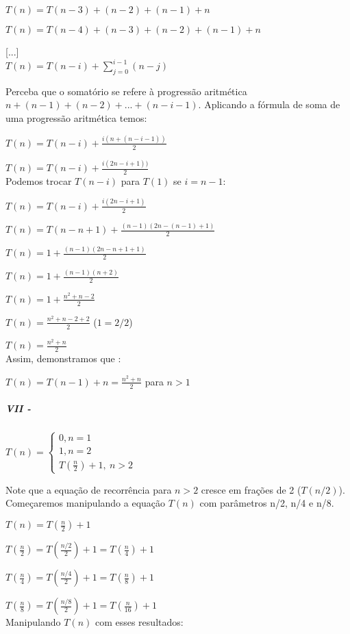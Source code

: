\documentclass[a4paper, twocolumn]{article}
\theoremstyle{definition}
\begin{document}
$T(n) =  T(n-3) + (n-2) + (n-1) + n$

$T(n) =  T(n-4) + (n-3) + (n-2) + (n-1) + n$

[...] \\

$T(n) =  T(n-i) + \sum_{j=0}^{i-1} (n-j)$

Perceba que o somatório se refere à progressão aritmética $n + (n-1) + (n-2) + ... + (n-i-1)$. Aplicando a fórmula de soma de uma progressão aritmética temos:

$T(n) = T(n-i) + \frac{i(n + (n-i-1))}{2}$

$T(n) = T(n-i) + \frac{i(2n-i+1))}{2}$ \\

Podemos trocar $T(n-i)$ para $T(1)$ se $i=n-1$:

$T(n) = T(n-i) + \frac{i(2n-i+1)}{2}$

$T(n) =  T(n-n+1) + \frac{(n-1)(2n-(n-1)+1)}{2}$

$T(n) =  1 + \frac{(n-1)(2n-n+1+1)}{2}$

$T(n) =  1 + \frac{(n-1)(n+2)}{2}$

$T(n) =  1 + \frac{n^2 + n -2}{2}$

$T(n) =  \frac{n^2 + n -2 + 2}{2}$ ($1=2/2$)

$T(n) =  \frac{n^2 + n}{2}$ \\

Assim, demonstramos que :

$T(n) = T(n-1) + n = \frac{n^2 + n}{2}$ para $n > 1$


\subparagraph{VII - } {$T(n) = \begin{cases} 
		0, n  = 1\\
		1, n  = 2\\
		T(\frac{n}{2}) + 1, \ n > 2
	\end{cases}$}

Note que a equação de recorrência para $n>2$ cresce em frações de 2 ($T(n/2)$). Começaremos manipulando a equação $T(n)$ com parâmetros n/2, n/4 e n/8.

$T(n) = T(\frac{n}{2}) + 1$

$T(\frac{n}{2}) = T(\frac{n/2}{2}) + 1 = T(\frac{n}{4}) + 1$

$T(\frac{n}{4}) = T(\frac{n/4}{2}) + 1 = T(\frac{n}{8}) + 1$

$T(\frac{n}{8}) = T(\frac{n/8}{2}) + 1 = T(\frac{n}{16}) + 1$ \\

Manipulando $T(n)$ com esses resultados:
\end{document}
